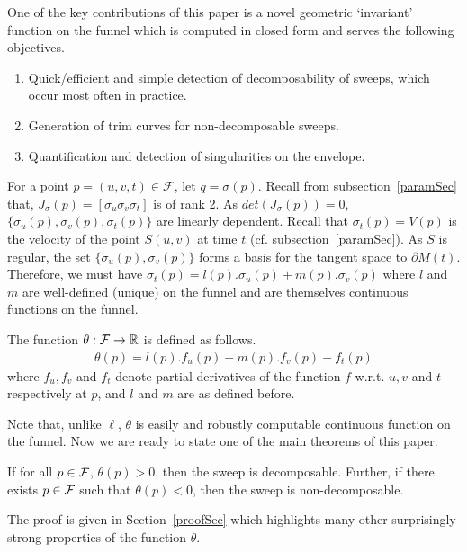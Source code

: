 \documentclass{elsart5p}
\begin{document}
One of the key contributions of this paper is a novel geometric 
`invariant' function on the funnel which is computed in closed form and 
serves the following objectives.
\begin{enumerate}
\item Quick/efficient and simple detection of decomposability of sweeps, which occur most often in practice.
\item Generation of trim curves for non-decomposable sweeps.
\item Quantification and detection of singularities on the envelope.
\end{enumerate}

For a point $p=(u,v,t) \in \mathcal{F}$, let $q=\sigma(p)$. 
Recall from subsection~\ref{paramSec} that, $J_{\sigma}(p)=[\sigma_u \sigma_v \sigma_t]$ is of rank 2.
As $det(J_{\sigma} (p))=0$, $\{\sigma_u(p), \sigma_v(p), \sigma_t(p)\}$ are linearly dependent. 
Recall that $\sigma_t(p) = V(p)$ is the velocity of the point $S(u,v)$ at time $t$ (cf. subsection~\ref{paramSec}).
As $S$ is regular, the set $\{\sigma_u(p), \sigma_v(p)\}$ forms a basis for the tangent space to $\partial M(t)$.
Therefore, we must have $\sigma_t(p) = l(p).\sigma_u(p) +m(p). \sigma_v(p) $ where $l$ and $m$ are well-defined (unique) on the funnel and are themselves continuous functions on the funnel.


\begin{defn} \label{thetaDef}
The function $\theta : {\cal F} \to \mathbb{R}$ is defined as follows.
\begin{align}	\label{thetaEq}
 \theta (p)= l(p).f_u(p) +m(p).f_v(p) -f_t(p) 
\end{align}
where $f_u, f_v$ and $f_t$ denote partial derivatives of the function $f$ w.r.t. $u,v$ and $t$ respectively at $p$, and $l$ and $m$ are as defined before.
\end{defn}

Note that, unlike $\ell$, $\theta$ is easily and robustly computable continuous 
function on the funnel.
Now we are ready to state one of the main theorems of this paper.

\begin{thm} \label{thetaDecompLem}
If for all $p \in {\cal F}$, $\theta(p) > 0$, then the sweep is decomposable.  
Further, 
if there exists $p \in {\cal F}$ such that $\theta(p) < 0$, then the sweep is 
non-decomposable.
\end{thm}
The proof is given in Section~\ref{proofSec} which highlights
many other surprisingly strong properties of the function $\theta$.
\end{document}
